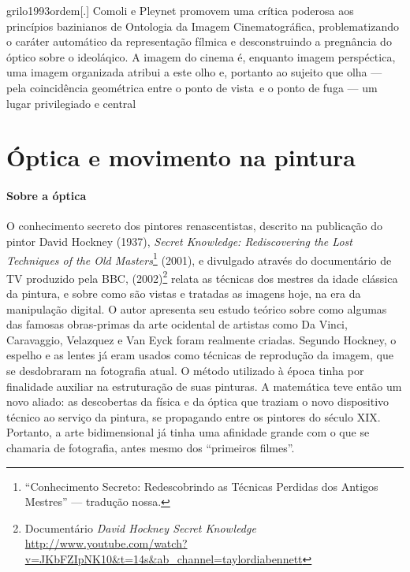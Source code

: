 \begin{displaycquote}[331-332]{grilo1993ordem}[.]
	Comoli e Pleynet promovem uma crítica poderosa aos princípios bazinianos
	de Ontologia da Imagem Cinematográfica, problematizando o caráter
	automático da representação fílmica e desconstruindo a pregnância do
	óptico sobre o ideoláqico. \textelp{} A imagem do cinema é, enquanto imagem
	perspéctica, uma imagem organizada \textelp{} atribui a este olho e, portanto
	ao sujeito que olha --- pela coincidência geométrica entre o ponto de
	vista~e o ponto de fuga --- um lugar privilegiado e central
\end{displaycquote}

\section{Óptica e movimento na pintura }%
\label{sec:optica-e-movimento-na-pintura}

\paragraph{Sobre a óptica} O conhecimento secreto dos pintores renascentistas, descrito na
publicação do pintor David Hockney (1937), \emph{Secret Knowledge:
	Rediscovering the Lost Techniques of the Old
	Masters}\footnote{\enquote{Conhecimento Secreto: Redescobrindo as
		Técnicas Perdidas dos Antigos Mestres} --- tradução nossa.} (2001), e
divulgado através do documentário de TV produzido pela BBC,
 (2002)\footnote{Documentário \emph{David
		Hockney Secret Knowledge}
	\url{http://www.youtube.com/watch?v=JKbFZIpNK10\&t=14s\&ab_channel=taylordiabennett}}
relata as técnicas dos mestres da idade clássica da pintura, e sobre
como são vistas e tratadas as imagens hoje, na era da manipulação
digital. O autor apresenta seu estudo teórico sobre como algumas das
famosas obras-primas da arte ocidental de artistas como Da Vinci,
Caravaggio, Velazquez e Van Eyck foram realmente criadas. Segundo
Hockney, o espelho e as lentes já eram usados como técnicas de
reprodução da imagem, que se desdobraram na fotografia atual. O método
utilizado à época tinha por finalidade auxiliar na estruturação de suas
pinturas. A matemática teve então um novo aliado: as descobertas da
física e da óptica que traziam o novo dispositivo técnico ao serviço da
pintura, se propagando entre os pintores do século XIX. Portanto, a
arte bidimensional já tinha uma afinidade grande com o que se chamaria
de fotografia, antes mesmo dos \enquote{primeiros filmes}.

